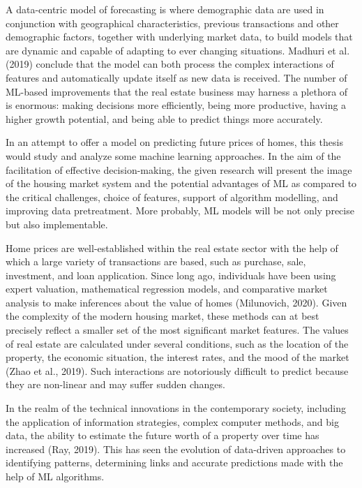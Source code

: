 \documentclass[12pt, a4paper, oneside]{book}
\begin{document}
A data-centric model of forecasting is where demographic data are used in conjunction with geographical characteristics, previous transactions and other demographic factors, together with underlying market data, to build models that are dynamic and capable of adapting to ever changing situations. Madhuri et al. (2019) conclude that the model can both process the complex interactions of features and automatically update itself as new data is received. The number of ML-based improvements that the real estate business may harness a plethora of is enormous: making decisions more efficiently, being more productive, having a higher growth potential, and being able to predict things more accurately.

In an attempt to offer a model on predicting future prices of homes, this thesis would study and analyze some machine learning approaches. In the aim of the facilitation of effective decision-making, the given research will present the image of the housing market system and the potential advantages of ML as compared to the critical challenges, choice of features, support of algorithm modelling, and improving data pretreatment. More probably, ML models will be not only precise but also implementable.

Home prices are well-established within the real estate sector with the help of which a large variety of transactions are based, such as purchase, sale, investment, and loan application. Since long ago, individuals have been using expert valuation, mathematical regression models, and comparative market analysis to make inferences about the value of homes (Milunovich, 2020). Given the complexity of the modern housing market, these methods can at best precisely reflect a smaller set of the most significant market features. The values of real estate are calculated under several conditions, such as the location of the property, the economic situation, the interest rates, and the mood of the market (Zhao et al., 2019). Such interactions are notoriously difficult to predict because they are non-linear and may suffer sudden changes.

In the realm of the technical innovations in the contemporary society, including the application of information strategies, complex computer methods, and big data, the ability to estimate the future worth of a property over time has increased (Ray, 2019). This has seen the evolution of data-driven approaches to identifying patterns, determining links and accurate predictions made with the help of ML algorithms.
\end{document}
